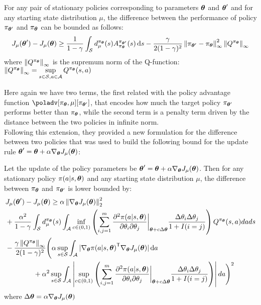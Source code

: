 \begin{theorem}
For any pair of stationary policies corresponding to parameters $\vtheta$ and $\vtheta'$ and for any starting state distribution $\mu$, the difference between the performance of policy $\pi_{\vtheta'}$ and $\pi_{\vtheta}$ can be bounded as follows:
\[
J_\mu(\vtheta') - J_\mu(\vtheta) \geq \frac{1}{1-\gamma}\int_{\sspace} d_\mu^{\pi_{\vtheta}}(s)A_{\pi_{\vtheta}}^{\pi_{\vtheta'}}(s)\de s - \frac{\gamma}{2(1-\gamma)^2}\norm[\infty]{\pi_{\vtheta'} - \pi_{\vtheta}}^2\norm[\infty]{Q^{\pi_{\vtheta}}}
\]
where $\norm[\infty]{Q^{\pi_{\vtheta}}}$ is the supremum norm of the Q-function: $\norm[\infty]{Q^{\pi_{\vtheta}}}=\sup\limits_{\substack{s\in\sspace, a\in\aspace}}Q^{\pi_{\vtheta}}(s,a)$
\end{theorem}
Here again we have two terms, the first related with the policy advantage function $\poladv[\pi_{\vtheta},\mu][\pi_{\vtheta'}]$, that encodes how much the target policy $\pi_{\vtheta'}$ performs better than $\pi_{\vtheta}$, while the second term is a penalty term driven by the distance between the two policies in infinite norm. \\
Following this extension, they provided a new formulation for the difference between two policies that was used to build the following bound for the update rule $\vtheta' = \vtheta + \alpha \gradj$:

\newcommand*{\pol}[1][]{\pi(a|s, \vtheta #1)}

\newcommand*{\secorder}{\left( \sum_{i,j=1}^{m} \frac{\partial^2\pol}{\partial\theta_i\partial\theta_j}\bigg|_{\vtheta + c\Delta\vtheta} \frac{\Delta\theta_i\Delta\theta_j}{1+I(i=j)} \right)}
\begin{theorem}
\label{th:pirotta-bound3}
Let the update of the policy parameters be $\vtheta'=\vtheta+\alpha\nabla_{\vtheta}J_\mu (\vtheta)$. Then for any stationary policy $\pol$ and any starting state distribution $\mu$, the difference between $\pi_{\vtheta}$ and $\pi_{\vtheta'}$ is lower bounded by:
\begin{align*}
&J_\mu(\vtheta') - J_\mu(\vtheta) \geq \alpha\norm[2]{\gradj}^2 \\
&+ \frac{\alpha^2}{1-\gamma}\int_{\sspace} d_\mu^{\pi_{\vtheta}}(s) \int_{\aspace} \inf_{c\in (0,1)} \secorder Q^{\pi_{\vtheta}}(s,a)dads
\\&-
\frac{\gamma\norm[\infty]{Q^{\pi_{\vtheta}}}}{2(1-\gamma)^2}\Bigg( \alpha \sup_{s\in\sspace}\int_{\aspace} |\nabla_{\vtheta}\transpose{\pol}\gradj | \de a
\\&\qquad\qquad + \alpha^2 \sup_{s\in\sspace}\int_{\aspace} \left| \sup_{c \in (0,1)} {\secorder} \right| da \Bigg)^2
\end{align*}
where $\Delta\vtheta=\alpha\gradj$
\end{theorem}

